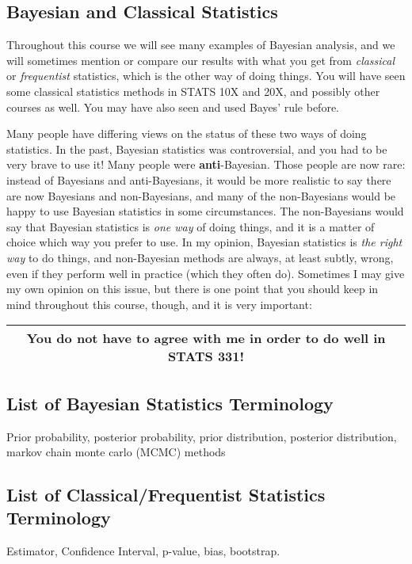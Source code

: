 \subsection{Bayesian and Classical Statistics}
Throughout this course we will see many examples of Bayesian analysis, and we
will sometimes mention or compare our results with what you get from
{\it classical} or {\it frequentist} statistics, which is the other way of
doing things. You will have seen some classical statistics methods in STATS
10X and 20X, and possibly other courses as well. You may have also seen and
used Bayes' rule before.

Many
people have differing views on the status of these two ways of doing statistics.
In the past, Bayesian statistics was controversial, and you had to be very
brave to use it! Many people were {\bf anti}-Bayesian. Those people are now
rare: instead of Bayesians and anti-Bayesians, it would be more realistic to
say there are now Bayesians and non-Bayesians, and many of the non-Bayesians
would be happy to use Bayesian statistics in some circumstances.
The non-Bayesians would say that
Bayesian statistics is {\it one way} of doing things, and it is a matter of
choice which way you prefer to use. In my opinion, Bayesian
statistics is {\it the right way} to do things, and non-Bayesian methods are
always, at least subtly, wrong, even if they perform well in practice (which
they often do). Sometimes I may give my own opinion on this issue, but
there is one point that you should keep in mind throughout
this course, though, and it is very important:

\begin{center}
\begin{tabular}{|c|}
\hline
{\bf You do not have to agree with me in order to do well in STATS 331!}\\
\hline
\end{tabular}
\end{center}

\subsection{List of Bayesian Statistics Terminology}
Prior probability, posterior probability, prior distribution, posterior
distribution, markov chain monte carlo (MCMC) methods

\subsection{List of Classical/Frequentist Statistics Terminology}
Estimator, Confidence Interval, p-value, bias, bootstrap.

